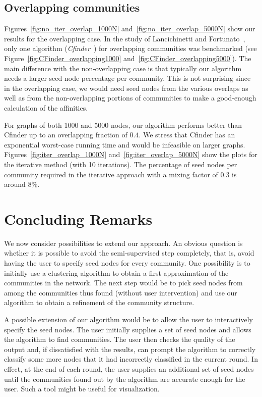 \subsection{Overlapping communities}
Figures~\ref{fig:no_iter_overlap_1000N} and~\ref{fig:no_iter_overlap_5000N} 
show our results for the overlapping case. In the study of Lancichinetti and Fortunato~\cite{LF09}, 
only one algorithm (\emph{Cfinder}~\cite{PDFV05}) for overlapping communities was benchmarked 
(see Figure~\ref{fig:CFinder_overlapping1000} and~\ref{fig:CFinder_overlapping5000}). 
The main difference with the non-overlapping case is that typically our algorithm needs a larger 
seed node percentage per community. This is not surprising since in the overlapping case, we would 
need seed nodes from the various overlaps as well as from the non-overlapping portions of communities 
to make a good-enough calculation of the affinities. 

For graphs of both 1000 and 5000 nodes, our algorithm performs better 
than Cfinder up to an overlapping fraction of $0.4$. We stress that Cfinder 
has an exponential worst-case running time and would be infeasible on larger graphs. 
%
Figures~\ref{fig:iter_overlap_1000N} and~\ref{fig:iter_overlap_5000N} show the 
plots for the iterative method (with 10 iterations). 
The percentage of seed nodes per community required in the 
iterative approach with a mixing factor of $0.3$ is around 8$\%$. 

\section{Concluding Remarks}
We now consider possibilities to extend our approach. 
An obvious question is whether it is possible to avoid the semi-supervised 
step completely, that is, avoid having the user to specify seed nodes 
for every community. One possibility is to initially use a clustering 
algorithm to obtain a first approximation of the communities in the network. 
The next step would be to pick seed nodes from among the communities thus found 
(without user intervention) and use our algorithm to obtain a refinement of the 
community structure. 


A possible extension of our algorithm would be to allow the user to interactively 
specify the seed nodes. The user initially supplies a set of seed nodes 
and allows the algorithm to find communities. The user then checks the 
quality of the output and, if dissatisfied with the results, can prompt the algorithm 
to correctly classify some more nodes that it had incorrectly classified in the current round. 
In effect, at the end of each round, the user supplies an additional set of seed nodes until the 
communities found out by the algorithm are accurate enough for the user. Such a tool 
might be useful for visualization.

